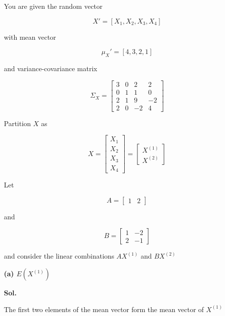 \documentclass[12pt]{article}
\begin{document}
\vspace{0.5cm}

\noindent
You are given the random vector

\[
X'
=
[X_1,X_2,X_3,X_4]
\]

\noindent
with mean vector

\[
\mu_X'
=
[4,3,2,1]
\]

\noindent
and variance-covariance matrix

\[
\Sigma_X
=
\begin{bmatrix}
3 & 0 & 2 & 2\\
0 & 1 & 1 & 0\\
2 & 1 & 9 & -2\\
2 & 0 & -2 & 4
\end{bmatrix}
\]

\noindent
Partition \(X\) as

\[
X
=
\begin{bmatrix}
X_1\\
X_2\\
X_3\\
X_4
\end{bmatrix}
=
\begin{bmatrix}
X^{(1)}\\
X^{(2)}
\end{bmatrix}
\]

\noindent
Let

\[
A=
\begin{bmatrix}
1 & 2
\end{bmatrix}
\]

\noindent
and

\[
B=
\begin{bmatrix}
1 & -2\\
2 & -1
\end{bmatrix}
\]

\noindent
and consider the linear combinations \(AX^{(1)}\) and \(BX^{(2)}\)

\vspace{0.5cm}

\noindent
\textbf{(a) \(E(X^{(1)})\)}

\vspace{0.5cm}

\noindent
\textbf{Sol.}

\vspace{0.3cm}

\noindent
The first two elements of the mean vector form the mean vector of \(X^{(1)}\)

\vspace{0.5cm}
\end{document}
